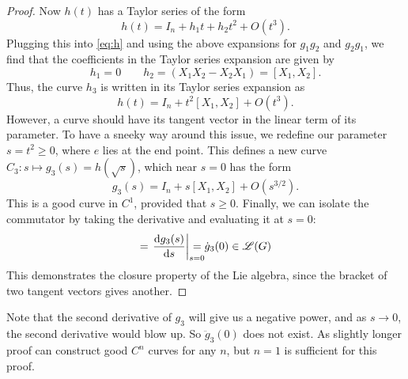 \begin{proof}
  Now $h(t)$ has a Taylor series of the form
  \begin{equation}
    h(t) = I_n + h_1 t + h_2 t^2 + O(t^3).
  \end{equation}
  Plugging this into \eqref{eq:h} and using the above expansions for $g_1 g_2$ and $g_2 g_1$, we find that the coefficients in the Taylor series expansion are given by
  \begin{equation}
    h_1 = 0 \qquad h_2 = (X_1 X_2 - X_2 X_1) = [X_1, X_2].
  \end{equation}
  Thus, the curve $h_3$ is written in its Taylor series expansion as
  \begin{equation}
    h(t) = I_n + t^2 [X_1, X_2] + O(t^3).
  \end{equation}
  However, a curve should have its tangent vector in the linear term of its parameter.
  To have a sneeky way around this issue, we redefine our parameter $s = t^2 \geq 0$, where $e$ lies at the end point.
  This defines a new curve $C_3: s \mapsto g_3(s) = h(\sqrt{s})$, which near $s = 0$ has the form
  \begin{equation}
    g_3(s) = I_n + s[X_1, X_2] + O(s^{3/2}).
  \end{equation}
  This is a good curve in $C^1$, provided that $s \geq 0$. 
  Finally, we can isolate the commutator by taking the derivative and evaluating it at $s = 0$:
  \begin{equation}
    [X_1, X_2] = \left.\dv{g_3(s)}{s}\right\rvert_{\mathrlap{s = 0}} = \dot g_3(0) \in \mathscr{L}(G)
  \end{equation}
  This demonstrates the closure property of the Lie algebra, since the bracket of two tangent vectors gives another.
\end{proof}
Note that the second derivative of $g_3$ will give us a negative power, and as $s \to 0$, the second derivative would blow up. So $\ddot g_3(0)$ does not exist. As slightly longer proof can construct good $C^n$ curves for any $n$, but $n = 1$ is sufficient for this proof.
